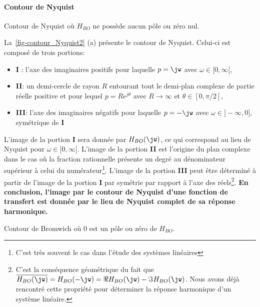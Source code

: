 \paragraph{Contour de Nyquist}
\begin{marginfigure}
    \centering
    
    \caption{Contour de Nyquist où $H_{BO}$ ne possède aucun pôle ou zéro nul.
    \label{fig-contour_Nyquist2}}
\end{marginfigure}
La~\cref{fig-contour_Nyquist2} (a) présente le contour de Nyquist. Celui-ci est 
composé de trois portions:
\begin{itemize}
    \item \textbf{I} : l'axe des imaginaires positifs pour laquelle $p=\jw$ 
          avec $\omega\in[0,\infty[$,
    \item \textbf{II}: un demi-cercle de rayon $R$ entourant tout le 
          demi-plan complexe de partie réelle positive et pour lequel 
          $p=Re^{j\theta}$ avec $R\rightarrow\infty$ et $\theta\in[0,\pi/2]$,
    \item \textbf{III}: l'axe des imaginaires négatifs  pour laquelle $p=-\jw$ 
          avec $\omega\in]-\infty,0]$, symétrique de \textbf{I}
\end{itemize}
L'image de la portion \textbf{I} sera donnée par $H_{BO}(\jw)$, ce qui 
correspond au lieu de Nyquist pour $\omega\in[0,\infty[$. L'image de la 
portion \textbf{II} est l'origine du plan complexe dans le cas où la fraction
rationnelle présente un degré au dénominateur supérieur à celui du 
numérateur\footnote{C'est très souvent le cas dans l'étude des systèmes 
linéaires}. 
L'image de la portion \textbf{III} peut être 
déterminé à partir de l'image de la portion \textbf{I} par symétrie par 
rapport à l'axe des réels\footnote{C'est la conséquence géométrique du fait que
$\overline{H_{BO}(\jw)}=H_{BO}(-\jw)=\Re{H_{BO}(\jw)}-\Im{H_{BO}(\jw)}$. 
Nous avons déjà rencontré cette propriété pour déterminer la réponse harmonique
d'un système linéaire.}.
\textbf{En conclusion, l'image par le contour de Nyquist d'une fonction de 
transfert est donnée par le lieu de Nyquist complet de sa réponse harmonique.}
\begin{marginfigure}
    \centering
    
    \caption{Contour de Bromwich où 0 est un pôle ou zéro 
             de $H_{BO}$.\label{fig-contour_Bromwich_1}} 
\end{marginfigure}
